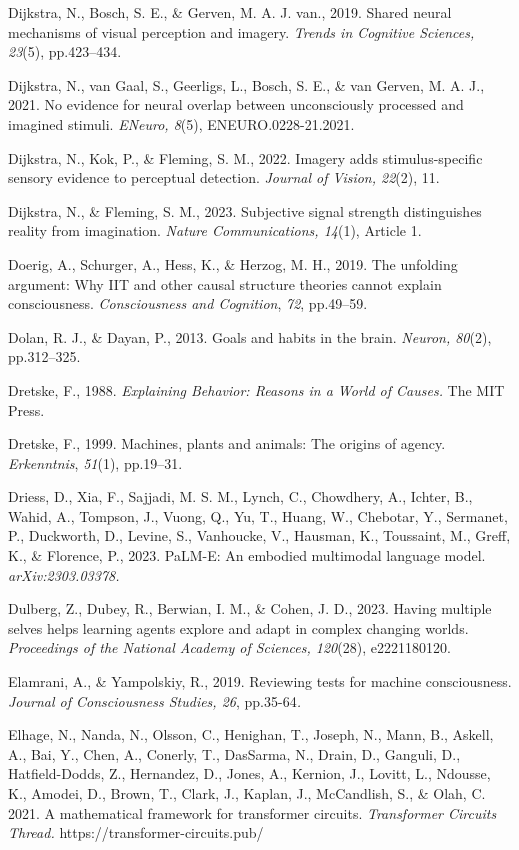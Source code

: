 \documentclass[12pt]{article}
\begin{document}
Dijkstra, N., Bosch, S. E., \& Gerven, M. A. J. van., 2019. Shared
neural mechanisms of visual perception and imagery. \emph{Trends in
Cognitive Sciences, 23}(5), pp.423--434.

Dijkstra, N., van Gaal, S., Geerligs, L., Bosch, S. E., \& van Gerven,
M. A. J., 2021. No evidence for neural overlap between unconsciously
processed and imagined stimuli. \emph{ENeuro, 8}(5),
ENEURO.0228-21.2021.

Dijkstra, N., Kok, P., \& Fleming, S. M., 2022. Imagery adds
stimulus-specific sensory evidence to perceptual detection.
\emph{Journal of Vision, 22}(2), 11.

Dijkstra, N., \& Fleming, S. M., 2023. Subjective signal strength
distinguishes reality from imagination. \emph{Nature Communications,
14}(1), Article 1.

Doerig, A., Schurger, A., Hess, K., \& Herzog, M. H., 2019. The
unfolding argument: Why IIT and other causal structure theories cannot
explain consciousness. \emph{Consciousness and Cognition}, \emph{72},
pp.49--59.

Dolan, R. J., \& Dayan, P., 2013. Goals and habits in the brain.
\emph{Neuron, 80}(2), pp.312--325.

Dretske, F., 1988. \emph{Explaining Behavior: Reasons in a World of
Causes.} The MIT Press.

Dretske, F., 1999. Machines, plants and animals: The origins of agency.
\emph{Erkenntnis}, \emph{51}(1), pp.19--31.

Driess, D., Xia, F., Sajjadi, M. S. M., Lynch, C., Chowdhery, A.,
Ichter, B., Wahid, A., Tompson, J., Vuong, Q., Yu, T., Huang, W.,
Chebotar, Y., Sermanet, P., Duckworth, D., Levine, S., Vanhoucke, V.,
Hausman, K., Toussaint, M., Greff, K., \& Florence, P., 2023. PaLM-E: An
embodied multimodal language model. \emph{arXiv:2303.03378.}

Dulberg, Z., Dubey, R., Berwian, I. M., \& Cohen, J. D., 2023. Having
multiple selves helps learning agents explore and adapt in complex
changing worlds. \emph{Proceedings of the National Academy of Sciences,
120}(28), e2221180120.

Elamrani, A., \& Yampolskiy, R., 2019. Reviewing tests for machine
consciousness. \emph{Journal of Consciousness Studies, 26},
pp.35-64\emph{.}

Elhage, N., Nanda, N., Olsson, C., Henighan, T., Joseph, N., Mann, B.,
Askell, A., Bai, Y., Chen, A., Conerly, T., DasSarma, N., Drain, D.,
Ganguli, D., Hatfield-Dodds, Z., Hernandez, D., Jones, A., Kernion, J.,
Lovitt, L., Ndousse, K., Amodei, D., Brown, T., Clark, J., Kaplan, J.,
McCandlish, S., \& Olah, C. 2021. A mathematical framework for
transformer circuits. \emph{Transformer Circuits Thread.}
https://transformer-circuits.pub/
\end{document}
